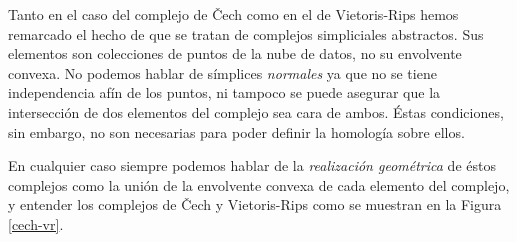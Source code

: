 \documentclass[12pt,a4paper,twoside]{article} %
\theoremstyle{plain}
\theoremstyle{definition}
\begin{document}
Tanto en el caso del complejo de Čech como en el de Vietoris-Rips hemos remarcado el hecho de que se tratan de complejos simpliciales abstractos. Sus elementos son colecciones de puntos de la nube de datos, no su envolvente convexa. No podemos hablar de símplices \emph{normales} ya que no se tiene independencia afín de los puntos, ni tampoco se puede asegurar que la intersección de dos elementos del complejo sea cara de ambos. Éstas condiciones, sin embargo, no son necesarias para poder definir la homología sobre ellos.

En cualquier caso siempre podemos hablar de la \emph{realización geométrica} de éstos complejos como la unión de la envolvente convexa de cada elemento del complejo, y entender los complejos de Čech y Vietoris-Rips como se muestran en la Figura \ref{cech-vr}. 
\end{document}
